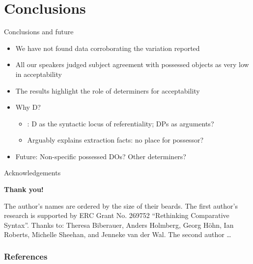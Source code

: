 \documentclass[12pt]{beamer}
\begin{document}
\section{Conclusions}

\begin{frame}{Conclusions and future}

    \begin{itemize}

        \item We have not found data corroborating the variation reported

        \item All our speakers judged subject agreement with possessed objects
            as very low in acceptability

        \item The results highlight \alert{the role of determiners for acceptability}

        \item Why D\@?

        \begin{itemize}

            \item \textcite{Longobardi2008,Bernstein2008}: D as the syntactic
                locus of referentiality; DPs as arguments?

            \item Arguably explains extraction facts: no place for possessor?

        \end{itemize}

        \item Future: Non-specific possessed DOs? Other determiners?

    \end{itemize}

\end{frame}

\begin{frame}{Acknowledgements}

\begin{center}
    \Large \textbf{Thank you!}
\end{center}

The author's names are ordered by the size of their beards.  The first author's
research is supported by ERC Grant No. 269752 \enquote{Rethinking Comparative
    Syntax}. Thanks to: Theresa Biberauer, Anders Holmberg, Georg Höhn, Ian
Roberts, Michelle Sheehan, and Jenneke van der Wal.  The second author \dots

\end{frame}

\begin{frame}[t, allowframebreaks]

    \frametitle{References}
    \newrefcontext[sorting=nyt]
    \renewcommand*{\bibfont}{\footnotesize}
    \printbibliography[heading=none]

\end{frame}
\end{document}
